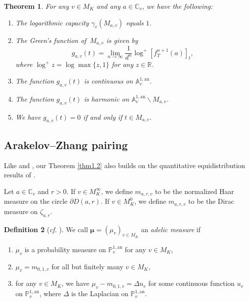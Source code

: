 \documentclass[10pt,a4paper]{amsart}
\numberwithin{equation}{section}
\theoremstyle{plain}
\newtheorem{thm}{Theorem}[section]
\theoremstyle{definition}
\newtheorem{defn}[thm]{Definition}
\theoremstyle{remark}
\newcommand{\A}{\mathbb A}
\newcommand{\C}{\mathbb C}
\newcommand{\PP}{\mathbb P}
\newcommand{\R}{\mathbb R}
\newcommand{\an}{\mathrm{an}}
\begin{document}
\begin{thm}
\label{thm2.1}For any $v\in M_{K}$ and any $a\in\C_{v}$,
we have the following:
\begin{enumerate}
\item The logarithmic capacity $\gamma_{v}(M_{a,v})$ equals $1$.
\item The Green's function of\, $M_{a,v}$ is given by
\[
g_{a,v}(t)=\lim_{n\to\infty}\frac{1}{d^{n}}\log^{+}\left[f_{T}^{n+1}(a)\right]_{t},
\]
where $\log^{+}z=\log\max\{z,1\}$ for any $z\in\R$.
\item The function $g_{a,v}(t)$ is continuous on $\A_{v}^{1,\an}$.
\item The function $g_{a,v}(t)$ is harmonic on $\A_{v}^{1,\an}\backslash M_{a,v}$.
\item We have  $g_{a,v}(t)=0$ if and only if $t\in M_{a,v}$.
\end{enumerate}
\end{thm}


\subsection{Arakelov--Zhang pairing}\label{sec2.4}

Like \cite[Theorem 1.7]{DKY1} and \cite[Theorem 1.9]{DKY2}, our Theorem
\ref{thm1.2} also builds on the quantitative equidistribution results
of \cite{FRL,Fi}.

Let $a\in\C_{v}$ and $r>0$. If $v\in M_{K}^{\infty}$, we
define $m_{a,r,v}$ to be the normalized Haar measure on the circle
$\partial D(a,r)$. If $v\in M_{K}^{0}$, we define $m_{a,r,v}$ to
be the Dirac measure on $\zeta_{a,r}$.

\begin{defn}[\textit{cf.} {\cite[D\'efinition 1.1]{FRL}}]\label{def2.2}
We call $\boldsymbol{\mu}=(\mu_{v})_{v\in M_{K}}$
an \textit{adelic measure} if
\begin{enumerate}
\item $\mu_{v}$ is a probability measure on $\PP_{v}^{1,\an}$
for any $v\in M_{K}$,
\item $\mu_{v}=m_{0,1,v}$ for all but finitely many $v\in M_{K}$,
\item for any $v\in M_{K}$, we have $\mu_{v}-m_{0,1,v}=\Delta u_{v}$ for some
continuous function $u_{v}$ on $\PP_{v}^{1,\an}$, where
$\Delta$ is the Laplacian on $\PP_{v}^{1,\an}$.
\end{enumerate}
\end{defn}
\end{document}
